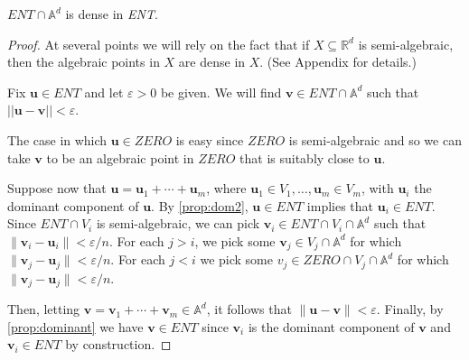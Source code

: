 \begin{corollary}
$\mathit{ENT}\cap\mathbb{A}^d$ is dense in \textit{ENT}.
\label{corl:dense}
\end{corollary}

\begin{proof}
  At several points we will rely on the fact that if
  $X\subseteq\mathbb{R}^d$ is semi-algebraic, then the algebraic
  points in $X$ are dense in $X$.  (See Appendix for details.)

  Fix $\boldsymbol u\in\mathit{ENT}$ and let $\varepsilon>0$ be
  given. We will find $\boldsymbol v\in \mathit{ENT}\cap \mathbb{A}^d$
  such that $||\boldsymbol u-\boldsymbol v||<\varepsilon$.

  The case in which $\boldsymbol u \in \mathit{ZERO}$ is easy since
  $\mathit{ZERO}$ is semi-algebraic and so we can take $\boldsymbol v$
  to be an algebraic point in $\mathit{ZERO}$ that is suitably close
  to $\boldsymbol u$.

  Suppose now that $\boldsymbol u=\boldsymbol u_1+\cdots+\boldsymbol
  u_m$, where $\boldsymbol u_1\in V_1,\ldots,\boldsymbol u_m\in V_m$,
  with $\boldsymbol u_i$ the dominant component of $\boldsymbol u$. By
  \cref{prop:dom2}, $\boldsymbol u\in\mathit{ENT}$ implies
  that $\boldsymbol u_i\in \mathit{ENT}$. Since $\mathit{ENT}\cap V_i$
  is semi-algebraic, we can pick $\boldsymbol v_i\in \mathit{ENT}\cap
  V_i\cap\mathbb{A}^d$ such that $\| \boldsymbol v_i -\boldsymbol u_i
  \|<\varepsilon/n$. For each $j>i$, we pick some $\boldsymbol v_j\in
  V_j\cap \mathbb{A}^d$ for which $\| \boldsymbol v_j - \boldsymbol
  u_j\|<\varepsilon/n$.  For each $j<i$ we pick some $v_j \in
  \mathit{ZERO}\cap V_j\cap \mathbb{A}^d$ for which $\| \boldsymbol
  v_j - \boldsymbol u_j\|<\varepsilon/n$.

  Then, letting $\boldsymbol v=\boldsymbol v_1+\cdots+\boldsymbol v_m
  \in \mathbb{A}^d$, it follows that $\|\boldsymbol u-\boldsymbol
  v\|<\varepsilon$.  Finally, by \cref{prop:dominant} we
  have $\boldsymbol v\in\mathit{ENT}$ since $\boldsymbol v_i$ is the
  dominant component of $\boldsymbol v$ and $\boldsymbol v_i \in
  \mathit{ENT}$ by construction.
\end{proof}
